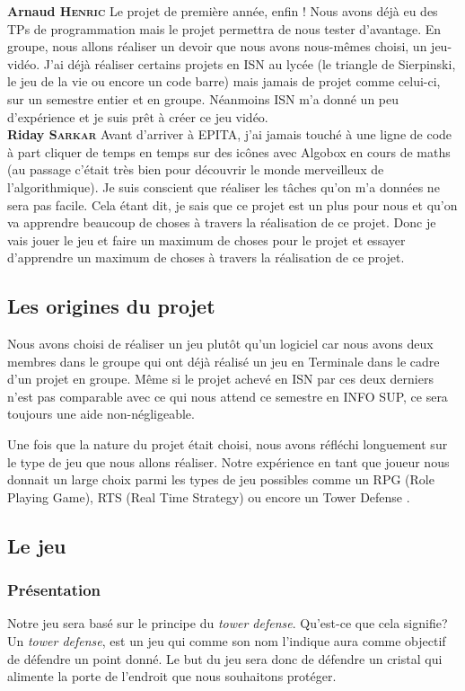 \documentclass[a4paper, 12pt]{article}
\begin{document}
	\parindent=0cm\textbf{Arnaud \textsc{Henric}}
	\smallbreak
	Le projet de première année, enfin ! Nous avons déjà eu des TPs de programmation mais le projet permettra de nous tester d’avantage. En groupe, nous allons réaliser un devoir que nous avons nous-mêmes choisi, un jeu-vidéo. J’ai déjà réaliser certains projets en ISN au lycée (le triangle de Sierpinski, le jeu de la vie ou encore un code barre) mais jamais de projet comme celui-ci, sur un semestre entier et en groupe. Néanmoins ISN m’a donné un peu d'expérience et je suis prêt à créer ce jeu vidéo.\\
\newpage	
	\parindent=0cm\textbf{Riday \textsc{Sarkar}}
	\smallbreak
 Avant d’arriver à EPITA,  j'ai jamais touché à une ligne de code à part cliquer de temps en temps sur des icônes avec Algobox en cours de maths (au passage c'était très bien pour découvrir  le monde merveilleux de l’algorithmique). Je suis conscient que réaliser les tâches qu’on m’a données ne sera pas facile. Cela étant dit, je sais que ce projet est un plus pour nous et qu’on va apprendre beaucoup de choses à travers la réalisation de ce projet. Donc je vais jouer le jeu et faire un maximum de choses pour le projet et essayer d’apprendre un maximum de choses à travers la réalisation de ce projet.\\

	\parindent=0.5cm 
	\subsection{Les origines du projet}
Nous avons choisi de réaliser un jeu plutôt qu’un logiciel car nous avons deux membres dans le groupe qui ont déjà réalisé un jeu en Terminale dans le cadre d’un projet en groupe. Même si le projet achevé en ISN par ces deux derniers n’est pas comparable avec ce qui nous attend ce semestre en INFO SUP, ce sera toujours une aide non-négligeable.
\par Une fois que la nature du projet était choisi, nous avons réfléchi longuement sur le type de jeu que nous allons réaliser. Notre expérience en tant que joueur nous donnait un large choix parmi les types de jeu possibles comme un RPG (Role Playing Game), RTS (Real Time Strategy) ou encore un Tower Defense . 

	\subsection{Le jeu}
		\subsubsection{Présentation}
		\par Notre jeu sera basé sur le principe du \textit{tower defense}. Qu'est-ce que 			cela signifie? Un \textit{tower defense}, est un jeu qui comme son nom l'indique 			aura comme objectif de défendre un point donné. Le but du jeu sera donc de défendre 		un cristal qui alimente la porte de l'endroit que nous souhaitons protéger.  
\end{document}
